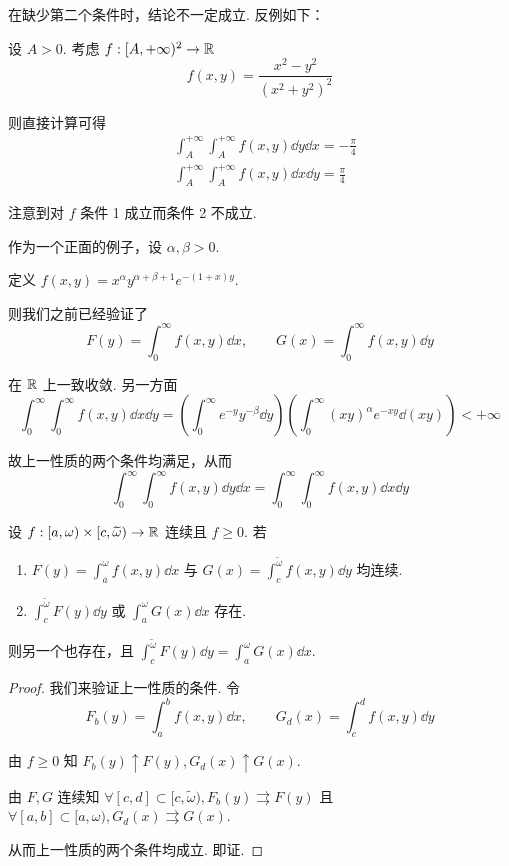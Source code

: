 \begin{hint}
    在缺少第二个条件时，结论不一定成立. 反例如下：
\end{hint}

\begin{example}
    设 $A>0$. 考虑 $f:[A,+\infty)^2\to\mathbb{R}$
$$
f(x,y)=\frac{x^2-y^2}{(x^2+y^2)^2}
$$

    则直接计算可得
$$
\begin{aligned}
    &\int_A^{+\infty}\int_A^{+\infty}f(x,y)\dd y\dd x=-\frac{\pi}{4}\\
    &\int_A^{+\infty}\int_A^{+\infty}f(x,y)\dd x\dd y=\frac{\pi}{4}
\end{aligned}
$$

    注意到对 $f$ 条件 1 成立而条件 2 不成立.
\end{example}

\begin{example}
    作为一个正面的例子，设 $\alpha,\beta>0$.

    定义 $f(x,y)=x^\alpha y^{\alpha+\beta+1}e^{-(1+x)y}$.

    则我们之前已经验证了
$$
F(y)=\int_0^\infty f(x,y)\dd x,\qquad G(x)=\int_0^\infty f(x,y)\dd y
$$

    在 $\mathbb{R}$ 上一致收敛. 另一方面
$$
\int_0^\infty\int_0^\infty f(x,y)\dd x\dd y=\left(\int_0^\infty e^{-y}y^{-\beta}\dd y\right)\left(\int_0^\infty(xy)^\alpha e^{-xy}\dd(xy)\right)<+\infty
$$

    故上一性质的两个条件均满足，从而
$$
\int_0^\infty\int_0^\infty f(x,y)\dd y\dd x=\int_0^\infty\int_0^\infty f(x,y)\dd x\dd y
$$
\end{example}

\begin{inference}
    设 $f:[a,\omega)\times[c,\widetilde{\omega})\to\mathbb{R}$ 连续且 $f\ge 0$. 若

    \begin{enumerate}
        \item $F(y)=\displaystyle\int_a^\omega f(x,y)\dd x$ 与 $G(x)=\displaystyle\int_c^{\widetilde{\omega}} f(x,y)\dd y$ 均连续.
        
        \item $\displaystyle\int_c^{\widetilde{\omega}}F(y)\dd y$ 或 $\displaystyle\int_a^\omega G(x)\dd x$ 存在.
    \end{enumerate}

    则另一个也存在，且 $\displaystyle\int_c^{\widetilde{\omega}}F(y)\dd y=\int_a^\omega G(x)\dd x$.
\end{inference}
\begin{proof}
    我们来验证上一性质的条件. 令
$$
F_b(y)=\int_a^bf(x,y)\dd x,\qquad G_d(x)=\int_c^d f(x,y)\dd y
$$

    由 $f\ge 0$ 知 $F_b(y)\uparrow F(y),G_d(x)\uparrow G(x)$.

    由 $F,G$ 连续知 $\forall [c,d]\subset[c,\widetilde{\omega}),F_b(y)\rightrightarrows F(y)$ 且 $\forall[a,b]\subset[a,\omega),G_d(x)\rightrightarrows G(x)$.

    从而上一性质的两个条件均成立. 即证.
\end{proof}

